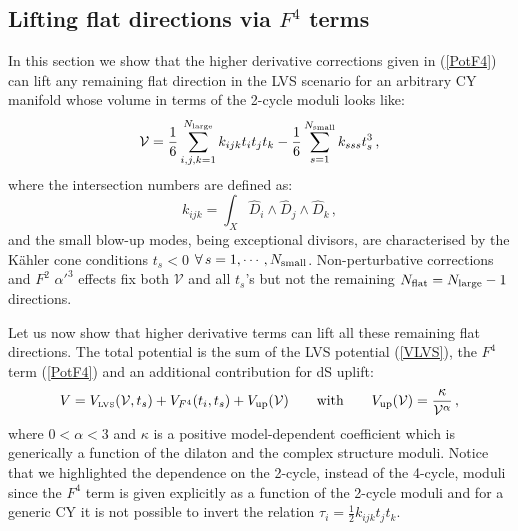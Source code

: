 \documentclass[11pt,a4paper]{article}
\newcommand{\be}{\begin{equation}}
\newcommand{\ee}{\end{equation}}
\def\LVS{{\scriptscriptstyle \rm LVS}}
\newcommand\vo{{\mathcal{V}}}
\begin{document}
\subsection{Lifting flat directions via $F^4$ terms}
\label{Sec1}

In this section we show that the higher derivative corrections given in (\ref{PotF4}) can lift any remaining flat direction in the LVS scenario for an arbitrary CY manifold whose volume in terms of the 2-cycle moduli looks like:
\be
\vo = \frac16 \sum_{i,j,k=1}^{N_{\rm large}} k_{ijk} t_i t_j t_k - \frac16 \sum_{s=1}^{N_{\rm small}} k_{sss} t_s^3 \,,
\label{VolForm}
\ee
where the intersection numbers are defined as:
\be
k_{ijk} = \int_X \hat{D}_i \wedge \hat{D}_j \wedge \hat{D}_k\,,
\ee
and the small blow-up modes, being exceptional divisors, are characterised by the K\"ahler cone conditions $t_s<0$ $\forall\, s=1,\cdots,N_{\rm small}$. Non-perturbative corrections and $F^2$ $\alpha'^3$ effects fix both $\vo$ and all $t_s$'s but not the remaining $N_{\rm flat}=N_{\rm large}-1$ directions. 

Let us now show that higher derivative terms can lift all these remaining flat directions. The total potential is the sum of the LVS potential (\ref{VLVS}), the $F^4$ term (\ref{PotF4}) and an additional contribution for dS uplift:
\be
V= V_\LVS (\vo, t_s) + V_{F^4} (t_i,t_s) + V_{\rm up}(\vo) \qquad\text{with}\qquad V_{\rm up}(\vo) = \frac{\kappa}{\vo^\alpha}\,,
\ee
where $0<\alpha<3$ and $\kappa$ is a positive model-dependent coefficient which is generically a function of the dilaton and the complex structure moduli. Notice that we highlighted the dependence on the 2-cycle, instead of the 4-cycle, moduli since the $F^4$ term is given explicitly as a function of the 2-cycle moduli and for a generic CY it is not possible to invert the relation $\tau_i = \frac12 k_{ijk} t_j t_k$. 
\end{document}
